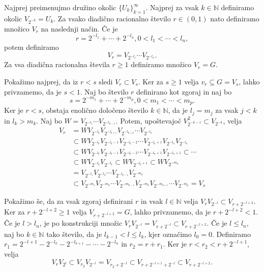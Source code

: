 \documentclass[mat1]{fmfdelo}
\newcommand{\N}{\mathbb N}
\begin{document}
\begin{dokaz}
Najprej preimenujmo družino okolic $\lbrace U_k \rbrace_{k = 1}^\infty$. Najprej za vsak $k \in \N$ definiramo okolic $V_{2^{-k}} = U_k$. Za vsako diadično racionalno število $r \in (0, 1)$ nato definiramo množico $V_r$ na naslednji način. Če je
\[ r = 2^{-l_1} + \cdots + 2^{-l_n}, 0 < l_1 < \cdots < l_n, \]
potem definiramo
\[ V_r = V_{2^{-l_1}}\cdots V_{2^{-l_n}}. \]
Za vsa diadična racionalna števila $r \geq 1$ definiramo množico $V_r = G$.

Pokažimo najprej, da iz $r < s$ sledi $V_r \subset V_s$. Ker za $s \geq 1$ velja $v_r \subseteq G = V_s$, lahko privzamemo, da je $s < 1$.
Naj bo število $r$ definirano kot zgoraj in naj bo
\[ s = 2^{-m_1} + \cdots + 2^{-m_p}, 0 < m_1 < \cdots < m_p. \]
Ker je $r < s$, obstaja enolično določeno število $k \in \N$, da je $l_j = m_j$ za vsak $j < k$ in $l_k > m_k$. Naj bo $W = V_{2^{-l_1}}\cdots V_{2^{-l_{k-1}}}$.
Potem, upoštevajoč $V_{2^{-k-1}}^2 \subset V_{2^{-k}}$, velja
\begin{align*}
V_r &= WV_{2^{-l_k}}V_{2^{-l_{k+1}}}V_{2^{-l_{k+2}}}\cdots V_{2^{-l_n}} \\
&\subset WV_{2^{-l_k}}V_{2^{-l_k-1}}V_{2^{-l_k-2}}\cdots V_{2^{-l_n+1}}V_{2^{-l_n}}V_{2^{-l_n}} \\
&\subset WV_{2^{-l_k}}V_{2^{-l_k-1}}V_{2^{-l_k-2}}\cdots V_{2^{-l_n+1}}V_{2^{-l_n+1}} \subset \cdots \\
&\subset WV_{2^{-l_k}}V_{2^{-l_k}} \subset WV_{2^{-l_k+1}} \subset WV_{2^{-m_k}} \\
&= V_{2^{-l_1}}V_{2^{-l_2}}\cdots V_{2^{-l_{k-1}}}V_{2^{-m_k}} \\
&\subset V_{2^{-m_1}}V_{2^{-m_2}}\cdots V_{2^{-m_{k-1}}}V_{2^{-m_k}}V_{2^{-m_{k+1}}}\cdots V_{2^{-m_p}} = V_s
\end{align*}

Pokažimo še, da za vsak zgoraj definirani $r$ in vsak $l \in \N$ velja $V_rV_{2^{-l}} \subset V_{r + 2^{-l+2}}$. Ker za $r + 2^{-l+2} \geq 1$ velja $V_{r + 2^{-l+2}} = G$, lahko privzamemo, da je  $r + 2^{-l+2} < 1$.
Če je $l > l_n$, je po konstrukciji množic $V_rV_{2^{-l}} = V_{r + 2^{-l}} \subset V_{r + 2^{-l+2}}$. Če je $l \leq l_n$, naj bo $k \in \N$ tako število, da je $l_{k-1} < l \leq l_k$, kjer označimo $l_0 = 0$. Definiramo $r_1 = 2^{-l+1} - 2^{-l_k} - 2^{-l_{k+1}} - \cdots - 2^{-l_n}$ in $r_2 = r + r_1$. Ker je $r < r_2 < r + 2^{-l+1}$, velja
\[ V_rV_{2^{l}} \subset V_{r_2}V_{2^{-l}} = V_{r_2 + 2^{-l}} \subset V_{r + 2^{-l+1} + 2^{-l}} \subset V_{r + 2^{-l+2}}. \]


\end{dokaz}
\end{document}
